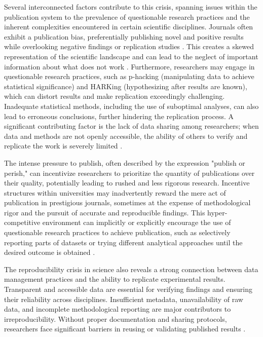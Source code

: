 \documentclass{article}
\begin{document}
Several interconnected factors contribute to this crisis, spanning issues within the publication system to the prevalence of questionable research practices and the inherent complexities encountered in certain scientific disciplines. Journals often exhibit a publication bias, preferentially publishing novel and positive results while overlooking negative findings or replication studies \cite{ioannidis2005most}. This creates a skewed representation of the scientific landscape and can lead to the neglect of important information about what does not work \cite{collins_policy_2014}. Furthermore, researchers may engage in questionable research practices, such as p-hacking (manipulating data to achieve statistical significance) and HARKing (hypothesizing after results are known), which can distort results and make replication exceedingly challenging. Inadequate statistical methods, including the use of suboptimal analyses, can also lead to erroneous conclusions, further hindering the replication process. A significant contributing factor is the lack of data sharing among researchers; when data and methods are not openly accessible, the ability of others to verify and replicate the work is severely limited \cite{munafo_manifesto_2017}.

The intense pressure to publish, often described by the expression "publish or perish," can incentivize researchers to prioritize the quantity of publications over their quality, potentially leading to rushed and less rigorous research. Incentive structures within universities may inadvertently reward the mere act of publication in prestigious journals, sometimes at the expense of methodological rigor and the pursuit of accurate and reproducible findings. This hyper-competitive environment can implicitly or explicitly encourage the use of questionable research practices to achieve publication, such as selectively reporting parts of datasets or trying different analytical approaches until the desired outcome is obtained \cite{david_robert_grimes_modelling_2018}.

The reproducibility crisis in science also reveals a strong connection between data management practices and the ability to replicate experimental results. Transparent and accessible data are essential for verifying findings and ensuring their reliability across disciplines. Insufficient metadata, unavailability of raw data, and incomplete methodological reporting are major contributors to irreproducibility. Without proper documentation and sharing protocols, researchers face significant barriers in reusing or validating published results \cite{samuel_understanding_2021}.
\end{document}
